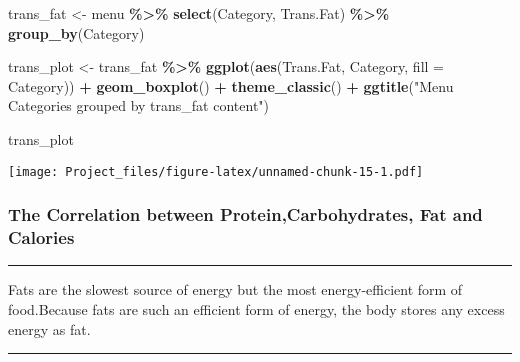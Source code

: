 \documentclass[
]{article}
\newenvironment{Shaded}{\begin{snugshade}}{\end{snugshade}}
\newcommand{\AttributeTok}[1]{\textcolor[rgb]{0.13,0.29,0.53}{#1}}
\newcommand{\FunctionTok}[1]{\textcolor[rgb]{0.13,0.29,0.53}{\textbf{#1}}}
\newcommand{\NormalTok}[1]{#1}
\newcommand{\OtherTok}[1]{\textcolor[rgb]{0.56,0.35,0.01}{#1}}
\newcommand{\SpecialCharTok}[1]{\textcolor[rgb]{0.81,0.36,0.00}{\textbf{#1}}}
\newcommand{\StringTok}[1]{\textcolor[rgb]{0.31,0.60,0.02}{#1}}
\begin{document}
\begin{Shaded}
\begin{Highlighting}[]
\NormalTok{trans\_fat }\OtherTok{\textless{}{-}}\NormalTok{ menu }\SpecialCharTok{\%\textgreater{}\%}
  \FunctionTok{select}\NormalTok{(Category,}
\NormalTok{         Trans.Fat) }\SpecialCharTok{\%\textgreater{}\%}
  \FunctionTok{group\_by}\NormalTok{(Category)}

\NormalTok{trans\_plot }\OtherTok{\textless{}{-}}\NormalTok{ trans\_fat }\SpecialCharTok{\%\textgreater{}\%} 
  \FunctionTok{ggplot}\NormalTok{(}\FunctionTok{aes}\NormalTok{(Trans.Fat,}
\NormalTok{             Category,}
             \AttributeTok{fill =}\NormalTok{ Category)) }\SpecialCharTok{+} 
  \FunctionTok{geom\_boxplot}\NormalTok{() }\SpecialCharTok{+} \FunctionTok{theme\_classic}\NormalTok{() }\SpecialCharTok{+}  \FunctionTok{ggtitle}\NormalTok{(}\StringTok{"Menu Categories grouped by trans\_fat content"}\NormalTok{)}

\NormalTok{trans\_plot}
\end{Highlighting}
\end{Shaded}

\texttt{[image: Project\_files/figure-latex/unnamed-chunk-15-1.pdf]}

\hypertarget{the-correlation-between-proteincarbohydrates-fat-and-calories}{%
\subsubsection{The Correlation between Protein,Carbohydrates, Fat and
Calories}\label{the-correlation-between-proteincarbohydrates-fat-and-calories}}

\begin{center}\rule{0.5\linewidth}{0.5pt}\end{center}

Fats are the slowest source of energy but the most energy-efficient form
of food.Because fats are such an efficient form of energy, the body
stores any excess energy as fat.

\begin{center}\rule{0.5\linewidth}{0.5pt}\end{center}
\end{document}
